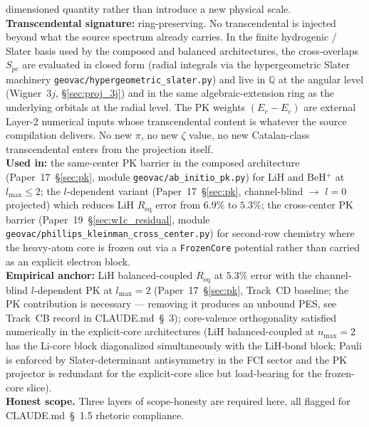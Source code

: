 dimensioned quantity rather than introduce a new physical scale.\\
\textbf{Transcendental signature:} ring-preserving.  No transcendental
is injected beyond what the source spectrum already carries.  In the
finite hydrogenic / Slater basis used by the composed and balanced
architectures, the cross-overlaps $S_{pc}$ are evaluated in closed
form (radial integrals via the hypergeometric Slater machinery
\texttt{geovac/hypergeometric\_slater.py}) and live in $\mathbb{Q}$ at
the angular level (Wigner~$3j$, \S\ref{sec:proj_3j}) and in the same
algebraic-extension ring as the underlying orbitals at the radial
level.  The PK weights $(E_v - E_c)$ are external Layer-2 numerical
inputs whose transcendental content is whatever the source compilation
delivers.  No new $\pi$, no new $\zeta$ value, no new Catalan-class
transcendental enters from the projection itself.\\
\textbf{Used in:} the same-center PK barrier in the composed
architecture (Paper~17~\S\ref{sec:pk}, module
\texttt{geovac/ab\_initio\_pk.py}) for LiH and BeH$^+$ at
$l_\text{max} \leq 2$; the $l$-dependent variant
(Paper~17~\S\ref{sec:pk}, channel-blind $\to$ $l = 0$ projected) which
reduces LiH $R_\text{eq}$ error from $6.9\%$ to $5.3\%$; the
cross-center PK barrier
(Paper~19~\S\ref{sec:w1c_residual}, module
\texttt{geovac/phillips\_kleinman\_cross\_center.py}) for second-row
chemistry where the heavy-atom core is frozen out via a
\texttt{FrozenCore} potential rather than carried as an explicit
electron block.\\
\textbf{Empirical anchor:} LiH balanced-coupled $R_\text{eq}$ at
$5.3\%$ error with the channel-blind $l$-dependent PK at
$l_\text{max} = 2$ (Paper~17~\S\ref{sec:pk}, Track~CD baseline; the
PK contribution is necessary --- removing it produces an unbound PES,
see Track~CB record in CLAUDE.md~\S~3); core-valence
orthogonality satisfied numerically in the explicit-core architectures
(LiH balanced-coupled at $n_\text{max}=2$ has the Li-core block
diagonalized simultaneously with the LiH-bond block; Pauli is
enforced by Slater-determinant antisymmetry in the FCI sector and the
PK projector is redundant for the explicit-core slice but
load-bearing for the frozen-core slice).\\
\textbf{Honest scope.}  Three layers of scope-honesty are required
here, all flagged for CLAUDE.md~\S~1.5 rhetoric compliance.

